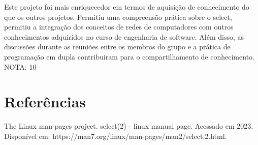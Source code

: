 \documentclass[a4paper]{article}
\begin{document}
Este projeto foi mais enriquecedor em termos de aquisição de conhecimento do que os outros projetos. Permitiu uma compreensão prática sobre o select, permitiu a integração dos conceitos de redes de computadores com outros conhecimentos adquiridos no curso de engenharia de software. Além disso, as discussões durante as reuniões entre os membros do grupo e a prática de programação em dupla contribuiram para o compartilhamento de conhecimento.
NOTA: 10


\section{Referências}

The Linux man-pages project. select(2) - linux manual page. Acessado em 2023.
Disponível em: https://man7.org/linux/man-pages/man2/select.2.html. 
\end{document}
